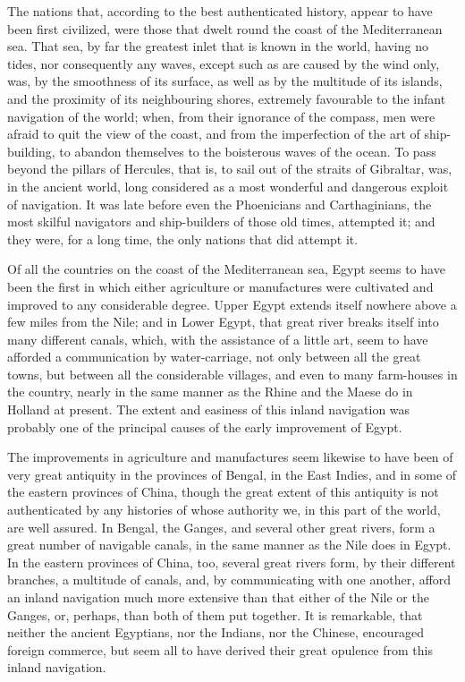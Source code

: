 The nations that, according to the best authenticated history, appear to have been first civilized, were those that dwelt round the coast of the Mediterranean sea. That sea, by far the greatest inlet that is known in the world, having no tides, nor consequently any waves, except such as are caused by the wind only, was, by the smoothness of its surface, as well as by the multitude of its islands, and the proximity of its neighbouring shores, extremely favourable to the infant navigation of the world; when, from their ignorance of the compass, men were afraid to quit the view of the coast, and from the imperfection of the art of ship-building, to abandon themselves to the boisterous waves of the ocean. To pass beyond the pillars of Hercules, that is, to sail out of the straits of Gibraltar, was, in the ancient world, long considered as a most wonderful and dangerous exploit of navigation. It was late before even the Phoenicians and Carthaginians, the most skilful navigators and ship-builders of those old times, attempted it; and they were, for a long time, the only nations that did attempt it.\par

Of all the countries on the coast of the Mediterranean sea, Egypt seems to have been the first in which either agriculture or manufactures were cultivated and improved to any considerable degree. Upper Egypt extends itself nowhere above a few miles from the Nile; and in Lower Egypt, that great river breaks itself into many different canals, which, with the assistance of a little art, seem to have afforded a communication by water-carriage, not only between all the great towns, but between all the considerable villages, and even to many farm-houses in the country, nearly in the same manner as the Rhine and the Maese do in Holland at present. The extent and easiness of this inland navigation was probably one of the principal causes of the early improvement of Egypt.\par

The improvements in agriculture and manufactures seem likewise to have been of very great antiquity in the provinces of Bengal, in the East Indies, and in some of the eastern provinces of China, though the great extent of this antiquity is not authenticated by any histories of whose authority we, in this part of the world, are well assured. In Bengal, the Ganges, and several other great rivers, form a great number of navigable canals, in the same manner as the Nile does in Egypt. In the eastern provinces of China, too, several great rivers form, by their different branches, a multitude of canals, and, by communicating with one another, afford an inland navigation much more extensive than that either of the Nile or the Ganges, or, perhaps, than both of them put together. It is remarkable, that neither the ancient Egyptians, nor the Indians, nor the Chinese, encouraged foreign commerce, but seem all to have derived their great opulence from this inland navigation.\par

